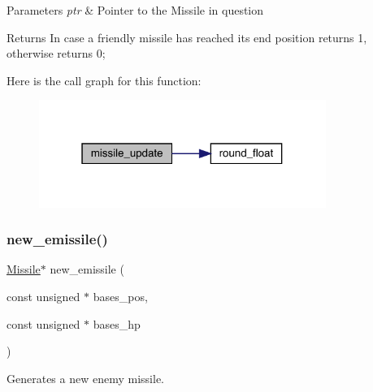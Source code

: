 \begin{DoxyParams}{Parameters}
{\em ptr} & Pointer to the Missile in question\\
\hline
\end{DoxyParams}
\begin{DoxyReturn}{Returns}
In case a friendly missile has reached it\textquotesingle{}s end position returns 1, otherwise returns 0; 
\end{DoxyReturn}
Here is the call graph for this function\+:\nopagebreak
\begin{figure}[H]
\begin{center}
\leavevmode
\includegraphics[width=265pt]{group___missile_ga6d0e1c431aa7534db74504a9505a7b60_cgraph}
\end{center}
\end{figure}
\hypertarget{group___missile_ga6a34d606d98bc4ce9643a20ba65fd472}{}\label{group___missile_ga6a34d606d98bc4ce9643a20ba65fd472} 
\subsubsection{\texorpdfstring{new\+\_\+emissile()}{new\_emissile()}}
{\footnotesize\ttfamily \hyperlink{group___missile_ga7ea98f7c879356e5dfa41934529d86e1}{Missile}$\ast$ new\+\_\+emissile (\begin{DoxyParamCaption}\item[{const unsigned $\ast$}]{bases\+\_\+pos,  }\item[{const unsigned $\ast$}]{bases\+\_\+hp }\end{DoxyParamCaption})}



Generates a new enemy missile. 



